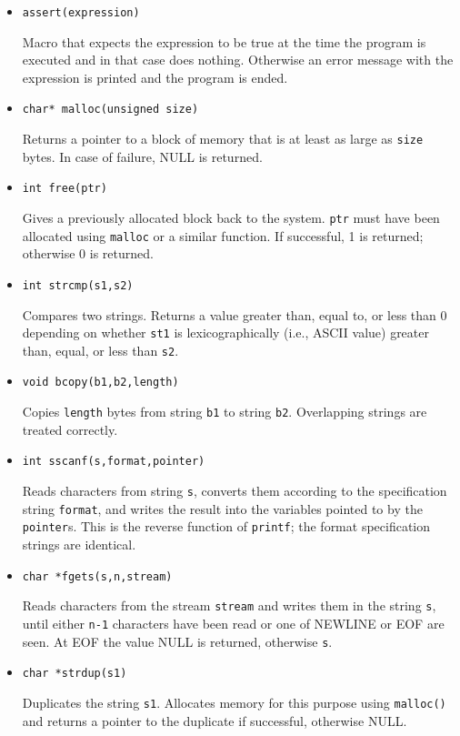 \begin{itemize}

\item {\tt assert(expression)}

Macro that expects the expression to be true at the time the
program is executed and in that case does nothing.  Otherwise an error
message with the expression is printed and the program is ended.

\item {\tt char* malloc(unsigned size)}

Returns a pointer to a block of memory that is at least as large as
{\tt size} bytes.  In case of failure, NULL is returned.

\item {\tt int free(ptr)}

Gives a previously allocated block back to the system.  
{\tt ptr} must have been allocated using {\tt malloc} or a similar
function.  If successful, 1 is returned; otherwise 0 is returned.

\item {\tt int strcmp(s1,s2)}

Compares two strings.  Returns a value greater than, equal to, or less
than 0 depending on whether {\tt st1} is lexicographically (i.e.,
ASCII value) greater than, equal, or less than {\tt s2}.

\item {\tt void bcopy(b1,b2,length)}

Copies {\tt length} bytes from string {\tt b1} to string {\tt b2}.
Overlapping strings are treated correctly.

\item {\tt int sscanf(s,format,pointer)}

Reads characters from string {\tt s}, converts them according to
the specification string {\tt format}, and writes the result into
the variables pointed to by the {\tt pointer}s.
This is the reverse function of {\tt printf}; the format specification
strings are identical.

\item {\tt char *fgets(s,n,stream)}

Reads characters from the stream {\tt stream} and writes them in the
string {\tt s}, until either {\tt n-1} characters have been read or
one of NEWLINE or EOF are seen.
At EOF the value NULL is returned, otherwise {\tt s}.

\item {\tt char *strdup(s1)}

Duplicates the string {\tt s1}.  Allocates memory for this purpose
using {\tt malloc()} and returns a pointer to the duplicate if
successful, otherwise NULL.

\end{itemize}
